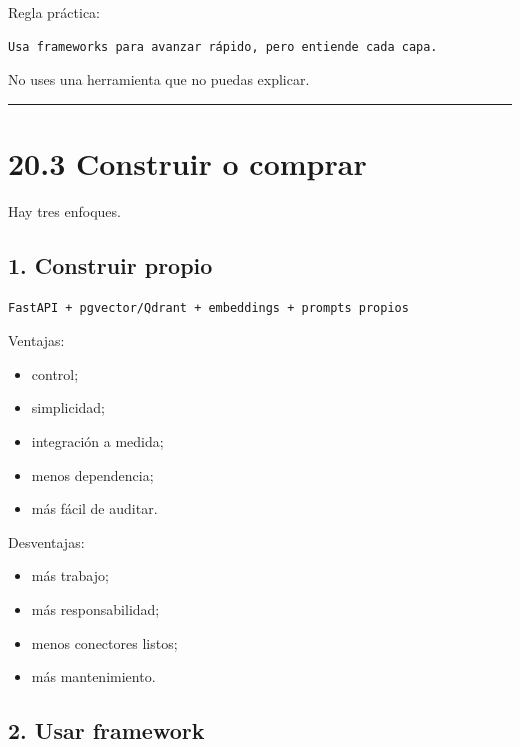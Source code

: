 Regla práctica:

\begin{lstlisting}
Usa frameworks para avanzar rápido, pero entiende cada capa.
\end{lstlisting}

No uses una herramienta que no puedas explicar.

\begin{center}\rule{0.5\linewidth}{0.5pt}\end{center}

\section{20.3 Construir o comprar}\label{construir-o-comprar}

Hay tres enfoques.

\subsection{1. Construir propio}\label{construir-propio}

\begin{lstlisting}
FastAPI + pgvector/Qdrant + embeddings + prompts propios
\end{lstlisting}

Ventajas:

\begin{itemize}
\tightlist
\item
  control;
\item
  simplicidad;
\item
  integración a medida;
\item
  menos dependencia;
\item
  más fácil de auditar.
\end{itemize}

Desventajas:

\begin{itemize}
\tightlist
\item
  más trabajo;
\item
  más responsabilidad;
\item
  menos conectores listos;
\item
  más mantenimiento.
\end{itemize}

\subsection{2. Usar framework}\label{usar-framework}

